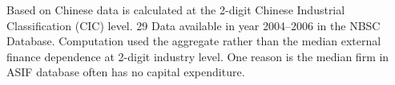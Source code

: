 \documentclass[
  convert={
    density=800 -alpha deactivate,
    size=1080x800,
    outext=.png
  },
]{standalone}
\begin{document}
\begin{table}[htbp]
{\begin{threeparttable}
\begin{tabular}{l*{2}{c}}
\hline
\end{tabular}
\begin{tablenotes}
      \small
      \item  Based on Chinese data is calculated at the 2-digit Chinese Industrial Classification (CIC) level. 29 Data available in year 2004–2006 in the NBSC Database. Computation used the aggregate rather than the median external finance dependence at 2-digit industry level. One reason is the median firm in ASIF database often has no capital expenditure. 
    \end{tablenotes}
    \label{tab:findep}
\end{threeparttable}}
\end{table}
\end{document}
